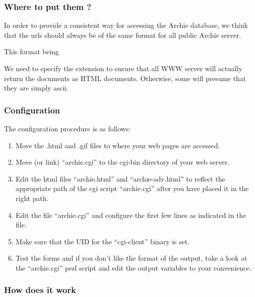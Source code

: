 \subsubsection{Where to put them ?}

In order to provide a consistent way for accessing the Archie database,
we think that the urls should always be of the same format for
all public Archie server.

This format being




We need to specify the  extension to ensure that all
WWW server will actually return the documents as  HTML documents. Otherwise,
some will presume that they are simply ascii.

\subsubsection{Configuration}

The configuration procedure is as follows:

\begin{enumerate}

\item Move the .html and .gif files to where your web pages are accessed.
\item Move (or link) ``archie.cgi'' to the cgi-bin directory of your web server.
\item
Edit the html files ``archie.html'' and ``archie-adv.html'' to reflect
the appropriate path of the cgi script ``archie.cgi'' after you have placed
it in the right path.

\item 
Edit the file ``archie.cgi'' and configure the first few lines as indicated
in the file.

\item Make sure that the UID for the ``cgi-client'' binary is set.


\item
Test the forms and if you don't like the format of the output, take a
look at the ``archie.cgi'' perl script and edit the output variables to your
convenience.
\end{enumerate}


\subsubsection{How does it work}

